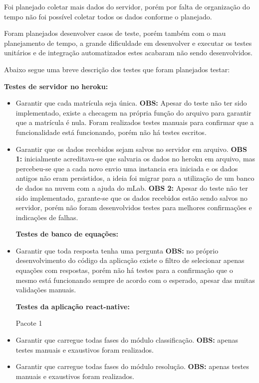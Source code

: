 Foi planejado coletar mais dados do servidor, porém por falta de organização do tempo não foi possível coletar todos os dados conforme o planejado. 

Foram planejados desenvolver casos de teste, porém também com o mau planejamento de tempo, a grande dificuldade em desenvolver e executar os testes unitários e de integração automatizados estes acabaram não sendo desenvolvidos.

Abaixo segue uma breve descrição dos testes que foram planejados testar:

\textbf{Testes de servidor no heroku:}
\begin{itemize}
	\item Garantir que cada matrícula seja única. \textbf{OBS:} Apesar do teste não ter sido implementado, existe a checagem na própria função do arquivo para garantir que a matrícula é nula. Foram realizados testes manuais para confirmar que a funcionalidade está funcionando, porém não há testes escritos.  


\item Garantir que os dados recebidos sejam salvos no servidor em arquivo. \textbf{OBS 1:} inicialmente acreditava-se que salvaria os dados no heroku em arquivo, mas percebeu-se que a cada novo envio uma instancia era iniciada e os dados antigos não eram persistidos, a ideia foi migrar para a utilização de um banco de dados na nuvem com a ajuda do mLab. \textbf{OBS 2:} Apesar do teste não ter sido implementado, garante-se que os dados recebidos estão sendo salvos no servidor, porém não foram desenvolvidos testes para melhores confirmações e indicações de falhas.  


\textbf{Testes de banco de equações:}
\item Garantir que toda resposta tenha uma pergunta \textbf{OBS:} no próprio desenvolvimento do código da aplicação existe o filtro de selecionar apenas equações com respostas, porém não há testes para a confirmação que o mesmo está funcionando sempre de acordo com o esperado, apesar das muitas validações manuais.  


\textbf{Testes da aplicação react-native:}

	Pacote 1
\item Garantir que carregue todas fases do módulo classificação. \textbf{OBS:} apenas testes manuais e exaustivos foram realizados.  

\item Garantir que carregue todas fases do módulo resolução. \textbf{OBS:} apenas testes manuais e exaustivos foram realizados.  


\end{itemize}
